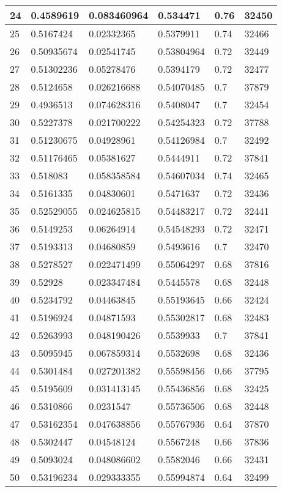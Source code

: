 \begin{longtable}{|l|l|l|l|l|l|}
24 & 0.4589619 & 0.083460964 & 0.534471 & 0.76 & 32450 \\ \hline 
25 & 0.5167424 & 0.02332365 & 0.5379911 & 0.74 & 32466 \\ \hline 
26 & 0.50935674 & 0.02541745 & 0.53804964 & 0.72 & 32449 \\ \hline 
27 & 0.51302236 & 0.05278476 & 0.5394179 & 0.72 & 32477 \\ \hline 
28 & 0.5124658 & 0.026216688 & 0.54070485 & 0.7 & 37879 \\ \hline 
29 & 0.4936513 & 0.074628316 & 0.5408047 & 0.7 & 32454 \\ \hline 
30 & 0.5227378 & 0.021700222 & 0.54254323 & 0.72 & 37788 \\ \hline 
31 & 0.51230675 & 0.04928961 & 0.54126984 & 0.7 & 32492 \\ \hline 
32 & 0.51176465 & 0.05381627 & 0.5444911 & 0.72 & 37841 \\ \hline 
33 & 0.518083 & 0.058358584 & 0.54607034 & 0.74 & 32465 \\ \hline 
34 & 0.5161335 & 0.04830601 & 0.5471637 & 0.72 & 32436 \\ \hline 
35 & 0.52529055 & 0.024625815 & 0.54483217 & 0.72 & 32441 \\ \hline 
36 & 0.5149253 & 0.06264914 & 0.54548293 & 0.72 & 32471 \\ \hline 
37 & 0.5193313 & 0.04680859 & 0.5493616 & 0.7 & 32470 \\ \hline 
38 & 0.5278527 & 0.022471499 & 0.55064297 & 0.68 & 37816 \\ \hline 
39 & 0.52928 & 0.023347484 & 0.5445578 & 0.68 & 32448 \\ \hline 
40 & 0.5234792 & 0.04463845 & 0.55193645 & 0.66 & 32424 \\ \hline 
41 & 0.5196924 & 0.04871593 & 0.55302817 & 0.68 & 32483 \\ \hline 
42 & 0.5263993 & 0.048190426 & 0.5539933 & 0.7 & 37841 \\ \hline 
43 & 0.5095945 & 0.067859314 & 0.5532698 & 0.68 & 32436 \\ \hline 
44 & 0.5301484 & 0.027201382 & 0.55598456 & 0.66 & 37795 \\ \hline 
45 & 0.5195609 & 0.031413145 & 0.55436856 & 0.68 & 32425 \\ \hline 
46 & 0.5310866 & 0.0231547 & 0.55736506 & 0.68 & 32448 \\ \hline 
47 & 0.53162354 & 0.047638856 & 0.55767936 & 0.64 & 37870 \\ \hline 
48 & 0.5302447 & 0.04548124 & 0.5567248 & 0.66 & 37836 \\ \hline 
49 & 0.5093024 & 0.048086602 & 0.5582046 & 0.66 & 32431 \\ \hline 
50 & 0.53196234 & 0.029333355 & 0.55994874 & 0.64 & 32499 \\ \hline 
\end{longtable}